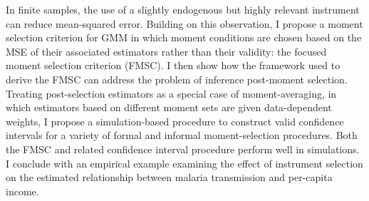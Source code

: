 In finite samples, the use of a slightly endogenous but highly relevant instrument can reduce mean-squared error. Building on this observation, I propose a moment selection criterion for GMM in which moment conditions are chosen based on the MSE of their associated estimators rather than their validity: the focused moment selection criterion (FMSC). 
I then show how the framework used to derive the FMSC can address the problem of inference post-moment selection.
Treating post-selection estimators as a special case of moment-averaging, in which estimators based on different moment sets are given data-dependent weights, I propose a simulation-based procedure to construct valid confidence intervals for a variety of formal and informal moment-selection procedures.
Both the FMSC and related confidence interval procedure perform well in simulations.
I conclude with an empirical example examining the effect of instrument selection on the estimated relationship between malaria transmission and per-capita income.